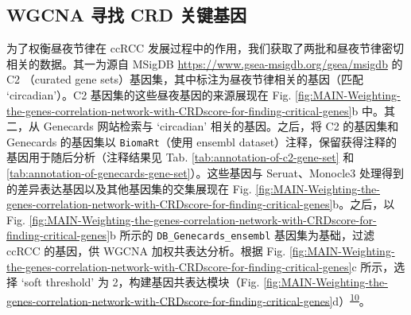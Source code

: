 \documentclass[
]{article}
\begin{document}
\hypertarget{wgc}{%
\subsection{WGCNA 寻找 CRD 关键基因}\label{wgc}}

为了权衡昼夜节律在 ccRCC 发展过程中的作用，我们获取了两批和昼夜节律密切相关的数据。其一为源自 MSigDB \url{https://www.gsea-msigdb.org/gsea/msigdb} 的 C2 （curated gene sets）基因集，其中标注为昼夜节律相关的基因（匹配 `circadian'）。C2 基因集的这些昼夜基因的来源展现在 Fig. \ref{fig:MAIN-Weighting-the-genes-correlation-network-with-CRDscore-for-finding-critical-genes}b 中。其二，从 Genecards 网站检索与 `circadian' 相关的基因。之后，将 C2 的基因集和 Genecards 的基因集以 \texttt{BiomaRt}（使用 ensembl dataset）注释，保留获得注释的基因用于随后分析（注释结果见 Tab. \ref{tab:annotation-of-c2-gene-set} 和 \ref{tab:annotation-of-genecards-gene-set}）。这些基因与 Seruat、Monocle3 处理得到的差异表达基因以及其他基因集的交集展现在 Fig. \ref{fig:MAIN-Weighting-the-genes-correlation-network-with-CRDscore-for-finding-critical-genes}b。之后，以 Fig. \ref{fig:MAIN-Weighting-the-genes-correlation-network-with-CRDscore-for-finding-critical-genes}b 所示的 \texttt{DB\_Genecards\_ensembl} 基因集为基础，过滤 ccRCC 的基因，供 WGCNA 加权共表达分析。根据 Fig. \ref{fig:MAIN-Weighting-the-genes-correlation-network-with-CRDscore-for-finding-critical-genes}c 所示，选择 `soft threshold' 为 2，构建基因共表达模块（Fig. \ref{fig:MAIN-Weighting-the-genes-correlation-network-with-CRDscore-for-finding-critical-genes}d）\textsuperscript{\protect\hyperlink{ref-WgcnaAnRPacLangfe2008}{10}}。
\end{document}
